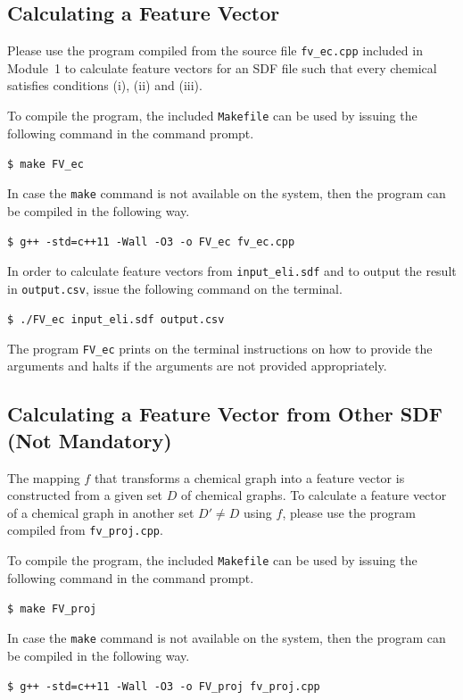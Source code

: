 \documentclass[11pt,titlepage,dvipdfmx,twoside]{book}
\begin{document}
\subsection{Calculating a Feature Vector}
Please use the program compiled from the source file
{\tt fv\_ec.cpp} included in Module~1
to calculate feature vectors for an SDF file
such that every chemical 
satisfies conditions (i), (ii) and (iii).

To compile the program, the included {\tt Makefile}
can be used by issuing the following command in the
command prompt. 
\begin{oframed}
{\small
\verb|$ make FV_ec|
}
\end{oframed}
%
In case the {\tt make} command is not
available on the system,
then the program can be compiled in the following way. 
\begin{oframed}
{\small
\verb|$ g++ -std=c++11 -Wall -O3 -o FV_ec fv_ec.cpp|
}
\end{oframed}


In order to calculate feature vectors from {\tt input\_eli.sdf} and to output the result in {\tt output.csv},
issue the following command on the terminal. 
\begin{oframed}
{\small
\verb|$ ./FV_ec input_eli.sdf output.csv|
}
\end{oframed}
The program {\tt FV\_ec} prints on the terminal instructions on how to provide the arguments
and halts if the arguments are not provided appropriately.

\subsection{Calculating a Feature Vector from Other SDF (Not Mandatory)}

The mapping $f$ that transforms a chemical graph
into a feature vector is constructed from a given
set $D$ of chemical graphs.
To calculate a feature vector
of a chemical graph in another set $D'\ne D$
using $f$, please use the program compiled from 
{\tt fv\_proj.cpp}. 

To compile the program, the included {\tt Makefile}
can be used by issuing the following command in the command prompt.
\begin{oframed}
{\small
\verb|$ make FV_proj|
}
\end{oframed}
In case the {\tt make} command is not available on the system,
then the program can be compiled in the following way.
\begin{oframed}
{\small
\verb|$ g++ -std=c++11 -Wall -O3 -o FV_proj fv_proj.cpp|
}
\end{oframed}
\end{document}
